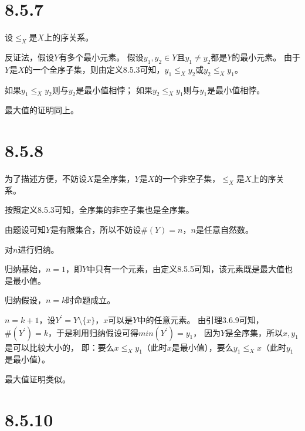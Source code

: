 \documentclass{article}
\begin{document}
\section*{8.5.7}

设$\leq_{X}$是$X$上的序关系。

反证法，假设$Y$有多个最小元素。
假设$y_1, y_2 \in Y$且$y_1 \neq y_2$都是$Y$的最小元素。
由于$Y$是$X$的一个全序子集，则由定义8.5.3可知，$y_1 \leq_{X} y_2$或$y_2 \leq_{X} y_1$。

如果$y_1 \leq_{X} y_2$则与$y_2$是最小值相悖；
如果$y_2 \leq_{X} y_1$则与$y_1$是最小值相悖。

最大值的证明同上。

\section*{8.5.8}
为了描述方便，不妨设$X$是全序集，$Y$是$X$的一个非空子集，$\leq_X$是$X$上的序关系。

按照定义8.5.3可知，全序集的非空子集也是全序集。

由题设可知$Y$是有限集合，所以不妨设$\#(Y) = n$，$n$是任意自然数。

对$n$进行归纳。

归纳基始，$n = 1$，即$Y$中只有一个元素，由定义8.5.5可知，该元素既是最大值也是最小值。

归纳假设，$n = k$时命题成立。

$n = k + 1$，设$Y^\prime = Y \setminus \{x\}$，$x$可以是$Y$中的任意元素。
由引理3.6.9可知，$\#(Y^\prime) = k$，于是利用归纳假设可得$min(Y^\prime) = y_1$，
因为$Y$是全序集，所以$x, y_1$是可以比较大小的，
即：要么$x \leq_X y_1$（此时$x$是最小值），要么$y_1 \leq_X x$（此时$y_1$是最小值）。

最大值证明类似。

\section*{8.5.10}
\end{document}
